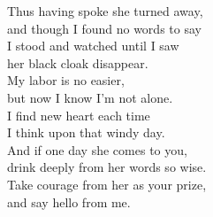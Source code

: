 \ve{}
Thus having spoke she turned away,\\
and though I found no words to say\\
I stood and watched until I saw\\
her black cloak disappear.\\
My labor is no easier,\\
but now I know I'm not alone.\\
I find new heart each time\\
I think upon that windy day.\\
And if one day she comes to you,\\
drink deeply from her words so wise.\\
Take courage from her as your prize,\\
and say hello from me.

\esong{}